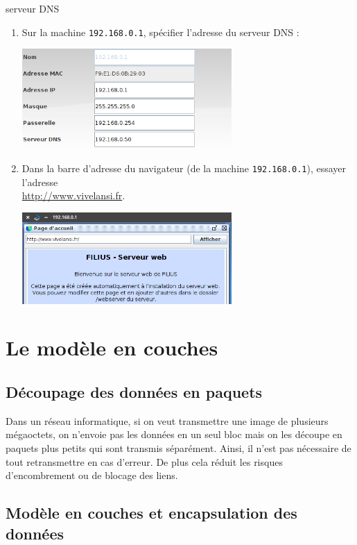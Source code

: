 \documentclass[a4paper,dvipsnames]{article}
\begin{document}
\begin{activite}[breakable]{serveur DNS}{}
\begin{enumerate}
    \item Sur la machine \texttt{192.168.0.1}, spécifier l'adresse du serveur DNS :

      \begin{center}
	\includegraphics[width=8cm]{img/specdns.png}
      \end{center}

    \item Dans la barre d'adresse du navigateur (de la machine \texttt{192.168.0.1}), essayer l'adresse \\\url{http://www.vivelansi.fr}.

      \begin{center}
	\includegraphics[width=8cm]{img/dnsex.png}
      \end{center}
  \end{enumerate}
\end{activite}

\section{Le modèle en couches}

\subsection{Découpage des données en paquets}

Dans un réseau informatique, si on veut transmettre une image de plusieurs mégaoctets, on n'envoie pas les données en un seul bloc mais on les découpe en paquets plus petits qui sont transmis séparément. Ainsi, il n'est pas nécessaire de tout retransmettre en cas d'erreur. De plus cela réduit les risques d'encombrement ou de blocage des liens.

\subsection{Modèle en couches et encapsulation des données}
\end{document}
